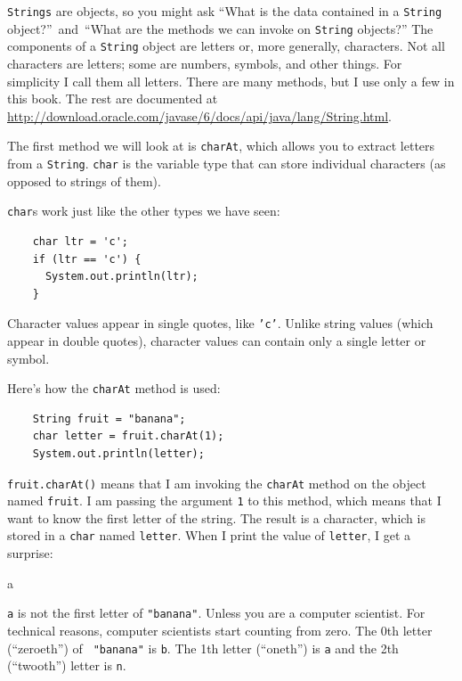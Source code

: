 \documentclass[12pt]{book}
\theoremstyle{exercise}
\begin{document}
{\tt Strings} are objects,
so you might ask ``What is the data
contained in a {\tt String} object?''~and~``What are the methods we
can invoke on {\tt String} objects?''
%
The components of a {\tt String} object are letters or, more generally,
characters.  Not all characters are letters; some are numbers,
symbols, and other things.  For simplicity I
call them all letters.
%
There are many methods, but I use only a few in this
book.  The rest are documented at
\url{http://download.oracle.com/javase/6/docs/api/java/lang/String.html}.

The first method we will look at is {\tt charAt}, which allows you to
extract letters from a {\tt String}.
{\tt char} is the variable type that can store
individual characters (as opposed to strings of them).


{\tt char}s work just like the other types we have seen:

\begin{lstlisting}
    char ltr = 'c';
    if (ltr == 'c') {
      System.out.println(ltr);
    }
\end{lstlisting}
%
Character values appear in single quotes, like {\tt 'c'}.  Unlike
string values (which appear in double quotes), character values
can contain only a single letter or symbol.


Here's how the {\tt charAt} method is used:

\begin{lstlisting}
    String fruit = "banana";
    char letter = fruit.charAt(1);
    System.out.println(letter);
\end{lstlisting}
%
{\tt fruit.charAt()} means that I am
invoking the {\tt charAt} method on the object named
{\tt fruit}.
I am passing the argument {\tt 1} to this method,
which means that I want to know the first letter of
the string.  The result is a character, which is stored in a
{\tt char} named {\tt letter}.  When I print the value of
{\tt letter}, I get a surprise:

\begin{verbatimtab}
a
\end{verbatimtab}
%
{\tt a} is not the first letter of {\tt "banana"}.  Unless you are a
computer scientist.  For technical reasons, computer scientists
start counting from zero.  The 0th letter (``zeroeth'') of {\tt
"banana"} is {\tt b}.  The 1th letter (``oneth'') is {\tt a} and the
2th (``twooth'') letter is {\tt n}.
\end{document}

